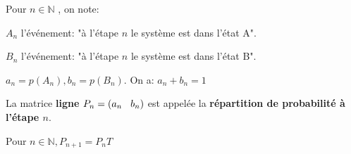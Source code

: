 \documentclass[french]{book}
\begin{document}
  \begin{defn}
   
   Pour $n \in \mathbb{N}$ , on note:
   
   $A_{n}$ l'événement: "à l'étape $n$ le système est dans l'état A".
   
   $B_{n}$ l'événement: "à l'étape $n$ le système est dans l'état B".
   
   $a_{n}=p(A_{n}), b_{n}=p(B_{n})$. On a: $\boxed{a_{n}+b_{n}=1}$
\end{defn}   
   
\begin{defn}
   
   La matrice \textbf{ligne} $P_{n}=(a_{n}\hspace{0.3cm} b_{n})$ est appelée la \textbf{répartition de probabilité à l'étape $n$}.
   
  \end{defn}

\begin{prop}
   
   Pour $n \in \mathbb{N},\boxed{P_{n+1}=P_{n}T}$
   
   \end{prop}
   
\end{document}
